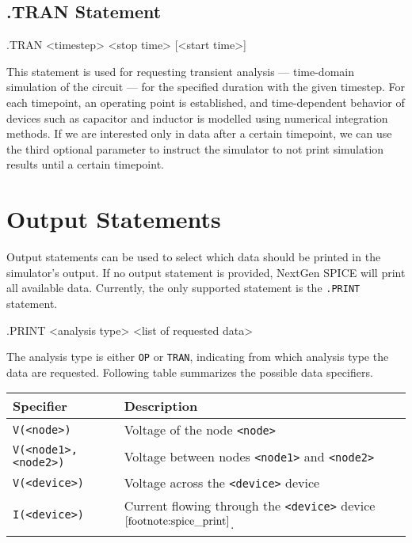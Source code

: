 \subsection{.TRAN Statement}

\begin{code}
.TRAN <timestep> <stop time> [<start time>]
\end{code}

This statement is used for requesting transient analysis --- time-domain simulation of the circuit --- for the specified duration with the given timestep. For each timepoint, an operating point is established, and time-dependent behavior of devices such as capacitor and inductor is modelled using numerical integration methods. If we are interested only in data after a certain timepoint, we can use the third optional parameter to instruct the simulator to not print simulation results until a certain timepoint.

\section{Output Statements}
\label{chap:spicecode-output}

Output statements can be used to select which data should be printed in the simulator's output. If no output statement is provided, NextGen SPICE will print all available data. Currently, the only supported statement is the \texttt{.PRINT} statement.

\begin{code}
.PRINT <analysis type> <list of requested data>
\end{code}

The analysis type is either \texttt{OP} or \texttt{TRAN}, indicating from which analysis type the data are requested. Following table summarizes the possible data specifiers.

\begin{center}
	\begin{tabular}{|l|l|}
		\hline
		Specifier & Description \\ \hline \hline
		\texttt{V(<node>)} & Voltage of the node \texttt{<node>} \\ \hline
		\texttt{V(<node1>,<node2>)} & Voltage between nodes \texttt{<node1>} and \texttt{<node2>} \\ \hline
		\texttt{V(<device>)} & Voltage across the \texttt{<device>} device\footnotemark  \\ \hline
		\texttt{I(<device>)} & Current flowing through the \texttt{<device>} device$^{\ref{footnote:spice_print}}$. \\ \hline
	\end{tabular}
\end{center}

